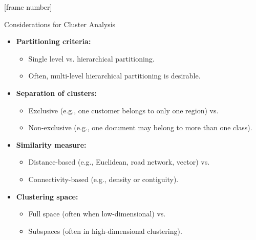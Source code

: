 \documentclass[aspectratio=169,t,xcolor=dvipsnames]{beamer}
\begin{document}
  {
    [frame number]
    \begin{frame}{Considerations for Cluster Analysis}
        \begin{itemize}
          \item \textbf{Partitioning criteria:}
          \begin{itemize}
            \item Single level vs. hierarchical partitioning.
            \item Often, multi-level hierarchical partitioning is desirable.
          \end{itemize}
          \item \textbf{Separation of clusters:}
          \begin{itemize}
            \item Exclusive (e.g., one customer belongs to only one region) vs.
            \item Non-exclusive (e.g., one document may belong to more than one class).
          \end{itemize}
          \item \textbf{Similarity measure:}
          \begin{itemize}
            \item Distance-based (e.g., Euclidean, road network, vector) vs.
            \item Connectivity-based (e.g., density or contiguity).
          \end{itemize}
          \item \textbf{Clustering space:}
          \begin{itemize}
            \item Full space (often when low-dimensional) vs.
            \item Subspaces (often in high-dimensional clustering).
          \end{itemize}
        \end{itemize}
    \end{frame}
  }
\end{document}
